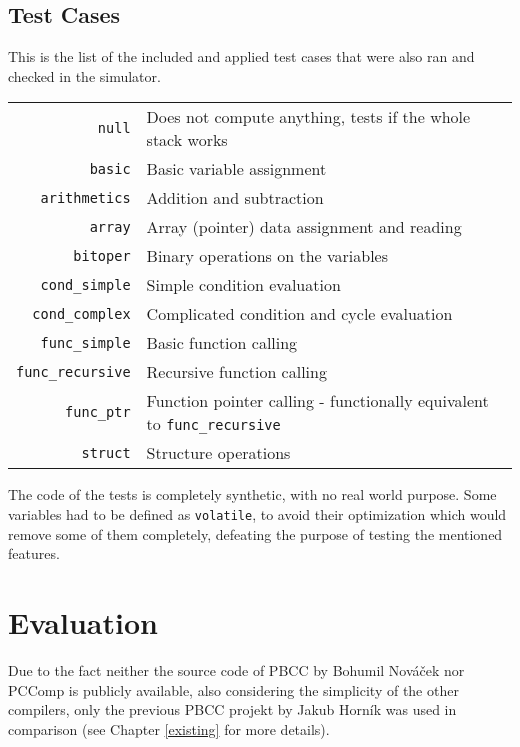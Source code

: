        \subsection{Test Cases}

            This is the list of the included and applied test cases that were also ran and checked in the simulator.

            \begin{center}
            \begin{tabular}{ r | l }
                \texttt{null} & Does not compute anything, tests if the whole stack works \\
                \texttt{basic} & Basic variable assignment \\
                \texttt{arithmetics} & Addition and subtraction \\
                \texttt{array} & Array (pointer) data assignment and reading \\
                \texttt{bitoper} & Binary operations on the variables \\
                \texttt{cond\_simple} & Simple condition evaluation \\
                \texttt{cond\_complex} & Complicated condition and cycle evaluation \\
                \texttt{func\_simple} & Basic function calling \\
                \texttt{func\_recursive} & Recursive function calling \\
                \texttt{func\_ptr} & Function pointer calling - functionally equivalent to \texttt{func\_recursive} \\
                \texttt{struct} & Structure operations \\
            \end{tabular}
            \end{center}

            The code of the tests is completely synthetic, with no real world purpose. Some variables had to be defined as \texttt{volatile}, to avoid their optimization which would remove some of them completely, defeating the purpose of testing the mentioned features.

    \section{Evaluation}

    Due to the fact neither the source code of PBCC by Bohumil Nováček nor PCComp is publicly available, also considering the simplicity of the other compilers, only the previous PBCC projekt by Jakub Horník was used in comparison (see Chapter \ref{existing} for more details).

